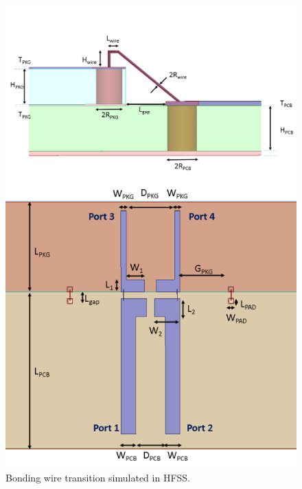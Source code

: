 \documentclass{book}  %
\begin{document}
\begin{paper}
\begin{figure}[htbp!]
	\centering	
	\begin{minipage}[tb]{\textwidth}
		\centering	
		\includegraphics[height=0.4\textheight]{./img/PCB/Bonding_Wire/view-Side.png}
	\end{minipage}%
	\vskip0.2in	
	\begin{minipage}[tb]{\textwidth}
		\centering	
		\includegraphics[height=0.4\textheight]{./img/PCB/Bonding_Wire/view-Top.png}
	\end{minipage}
	\label{fig:bonding_wire_HFSS}
	\caption{Bonding wire transition simulated in HFSS.}
\end{figure}


\end{paper}
\end{document}
